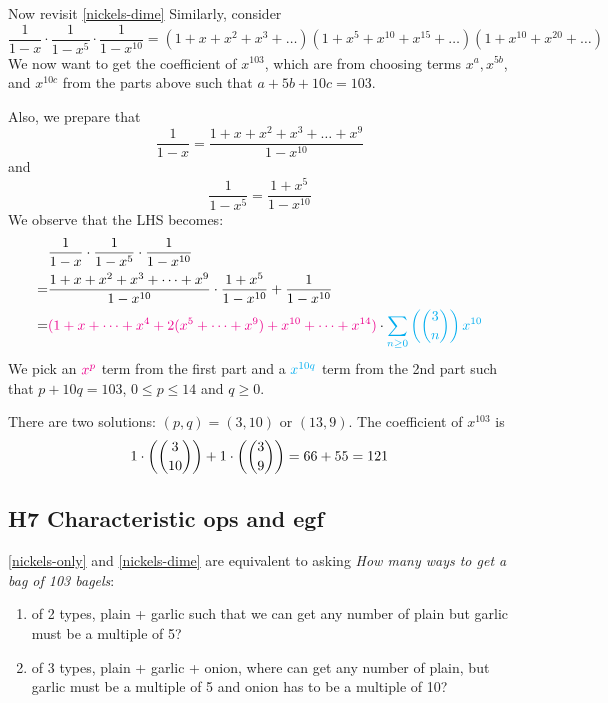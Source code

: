 \documentclass[12pt]{article}
\begin{document}
Now revisit \cref{nickels-dime}
Similarly, consider \[\frac{1}{1-x}\cdot \frac{1}{1-x^5}\cdot \frac{1}{1-x^{10}}= (1+x+x^2+x^3+\dots)(1+x^5+x^{10}+x^{15}+\dots)(1+x^{10}+x^{20}+\dots)\]
We now want to get the coefficient of $x^{103}$, which are from choosing terms $x^{a}, x^{5b}$, and $x^{10c}$ from the parts above such that $a+5b+10c=103$.

Also, we prepare that \[\frac{1}{1-x}=\frac{1+x+x^2+x^3+\dots+x^9}{1-x^{10}}\] and \[\frac{1}{1-x^5}=\frac{1+x^5}{1-x^{10}}\]
We observe that the LHS becomes:
\begin{align*}
    &\frac{1}{1-x}\cdot \frac{1}{1-x^5}\cdot \frac{1}{1-x^{10}}\\
    =& \frac{1+x+x^2+x^3+\dots+x^9}{1-x^{10}}\cdot \frac{1+x^5}{1-x^{10}} + \frac{1}{1-x^{10}}\\
    =& \textcolor{magenta}{(1+x+\dots + x^4 + 2(x^5+\dots+x^9)+x^{10}+\dots + x^{14})} \cdot \textcolor{cyan}{\sum_{n\geq 0}\left({3\choose n}\right)x^{10}}
\end{align*}
We pick an $\textcolor{magenta}{x^p}$ term from the first part and a $\textcolor{cyan}{x^{10q}}$ term from the 2nd part such that $p+10q=103$, $0\leq p\leq 14$ and $q\geq 0$. 

There are two solutions: $(p,q)=(3,10)$ or $(13,9)$. The coefficient of $x^{103}$ is $$1\cdot \left({3\choose 10}\right)+1\cdot \left({3\choose 9}\right)=66+55=121$$

\subsection{H7 Characteristic ops and egf}
\cref{nickels-only} and \cref{nickels-dime} are equivalent to asking \textit{How many ways to get a bag of 103 bagels}:
\begin{enumerate}
    \item of 2 types, plain + garlic such that we can get any number of plain but garlic must be a multiple of 5?
    \item of 3 types, plain + garlic + onion, where can get any number of plain, but garlic must be a multiple of 5 and onion has to be a multiple of 10?
\end{enumerate}
\end{document}
